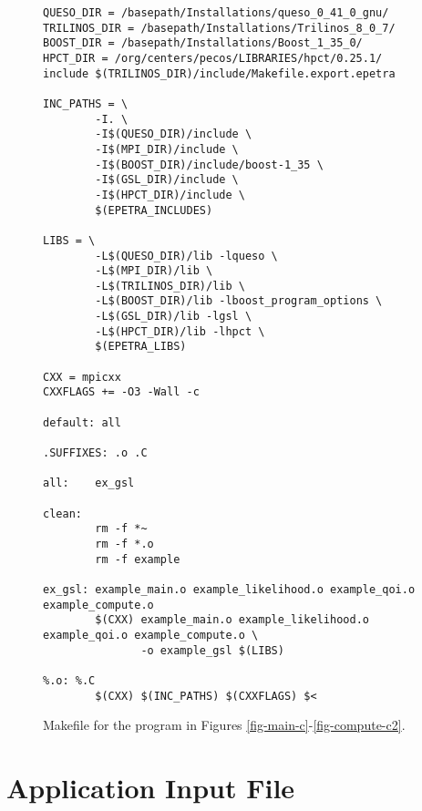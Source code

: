 \begin{figure}[h!]
\begin{center}
\begin{verbatim}
QUESO_DIR = /basepath/Installations/queso_0_41_0_gnu/
TRILINOS_DIR = /basepath/Installations/Trilinos_8_0_7/
BOOST_DIR = /basepath/Installations/Boost_1_35_0/
HPCT_DIR = /org/centers/pecos/LIBRARIES/hpct/0.25.1/
include $(TRILINOS_DIR)/include/Makefile.export.epetra

INC_PATHS = \
        -I. \
        -I$(QUESO_DIR)/include \
        -I$(MPI_DIR)/include \
        -I$(BOOST_DIR)/include/boost-1_35 \
        -I$(GSL_DIR)/include \
        -I$(HPCT_DIR)/include \
        $(EPETRA_INCLUDES)

LIBS = \
        -L$(QUESO_DIR)/lib -lqueso \
        -L$(MPI_DIR)/lib \
        -L$(TRILINOS_DIR)/lib \
        -L$(BOOST_DIR)/lib -lboost_program_options \
        -L$(GSL_DIR)/lib -lgsl \
        -L$(HPCT_DIR)/lib -lhpct \
        $(EPETRA_LIBS)

CXX = mpicxx
CXXFLAGS += -O3 -Wall -c

default: all

.SUFFIXES: .o .C

all:    ex_gsl

clean:
        rm -f *~
        rm -f *.o
        rm -f example

ex_gsl: example_main.o example_likelihood.o example_qoi.o example_compute.o
        $(CXX) example_main.o example_likelihood.o example_qoi.o example_compute.o \
               -o example_gsl $(LIBS)

%.o: %.C
        $(CXX) $(INC_PATHS) $(CXXFLAGS) $<
\end{verbatim}
\end{center}
\caption{
Makefile for the program in Figures \ref{fig-main-c}-\ref{fig-compute-c2}.
}
\label{fig-make}
\end{figure}

\clearpage
\section{Application Input File}

